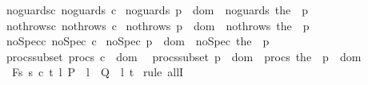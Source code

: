\begin{isabellebody}
\ noguards{\isacharunderscore}c{\isacharcolon}\ {\isachardoublequoteopen}noguards\ c{\isachardoublequoteclose}\isanewline
{}\ noguards{\isacharunderscore}{\isasymGamma}{\isacharcolon}\ {\isachardoublequoteopen}{\isasymforall}p\ {\isasymin}\ dom\ {\isasymGamma}{\isachardot}\ noguards\ {\isacharparenleft}the\ {\isacharparenleft}{\isasymGamma}\ p{\isacharparenright}{\isacharparenright}{\isachardoublequoteclose}\isanewline
{}\ nothrows{\isacharunderscore}c{\isacharcolon}\ {\isachardoublequoteopen}nothrows\ c{\isachardoublequoteclose}\isanewline
{}\ nothrows{\isacharunderscore}{\isasymGamma}{\isacharcolon}\ {\isachardoublequoteopen}{\isasymforall}p\ {\isasymin}\ dom\ {\isasymGamma}{\isachardot}\ nothrows\ {\isacharparenleft}the\ {\isacharparenleft}{\isasymGamma}\ p{\isacharparenright}{\isacharparenright}{\isachardoublequoteclose}\isanewline
{}\ noSpec{\isacharunderscore}c{\isacharcolon}\ {\isachardoublequoteopen}noSpec\ c{\isachardoublequoteclose}\isanewline
{}\ noSpec{\isacharunderscore}{\isasymGamma}{\isacharcolon}\ {\isachardoublequoteopen}{\isasymforall}p\ {\isasymin}\ dom\ {\isasymGamma}{\isachardot}\ noSpec\ {\isacharparenleft}the\ {\isacharparenleft}{\isasymGamma}\ p{\isacharparenright}{\isacharparenright}{\isachardoublequoteclose}\isanewline
{}\ procs{\isacharunderscore}subset{\isacharcolon}\ {\isachardoublequoteopen}procs\ c\ {\isasymsubseteq}\ dom\ {\isasymGamma}{\isachardoublequoteclose}\isanewline
{}\ procs{\isacharunderscore}subset{\isacharunderscore}{\isasymGamma}{\isacharcolon}\ {\isachardoublequoteopen}{\isasymforall}p\ {\isasymin}\ dom\ {\isasymGamma}{\isachardot}\ procs\ {\isacharparenleft}the\ {\isacharparenleft}{\isasymGamma}\ p{\isacharparenright}{\isacharparenright}\ {\isasymsubseteq}\ dom\ {\isasymGamma}{\isachardoublequoteclose}\isanewline
{}\ {\isachardoublequoteopen}{\isasymforall}{\isasymsigma}{\isachardot}\ {\isasymGamma}{\isacharcomma}{\isasymTheta}{\isasymturnstile}\isactrlbsub {\isacharslash}F\isactrlesub {\isacharbraceleft}s{\isachardot}\ s{\isacharequal}{\isasymsigma}{\isacharbraceright}\ c\ {\isacharbraceleft}t{\isachardot}\ {\isasymforall}l{\isachardot}\ P\ {\isasymsigma}\ l\ {\isasymlongrightarrow}\ Q\ {\isasymsigma}\ l\ t{\isacharbraceright}{\isacharcomma}{\isacharbraceleft}{\isacharbraceright}{\isachardoublequoteclose}\isanewline
%
\isadelimproof
%
\endisadelimproof
%
\isatagproof
{}\isamarkupfalse%
\ {\isacharparenleft}rule\ allI{\isacharparenright}\isanewline

\end{isabellebody}
